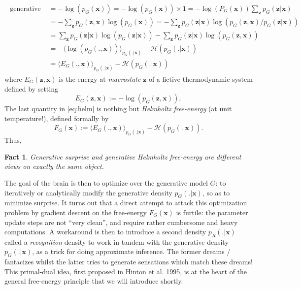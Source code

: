 \documentclass[10pt,letterpaper]{article}
\newtheorem{fact}[thm]{Fact}
\def\z{\mathbf{z}}
\def\x{\mathbf{x}}
\begin{document}
\begin{eqnarray}
  \begin{split}
    \text{generative surprise } &= -\log(p_G(\x)) = -\log(p_G(\x)) \times 1 = -\log(P_G(\x))\sum_{\z}p_G(\z |\x)\\
    &= -\sum_{\z}p_G(\z, \x)\log(p_G(\x))
    =-\sum_{\z}p_G(\z |\x)\log(p_G(\z, \x)/p_G(\z|\x))\\
    &= \sum_{\z}p_G(\z |\x)\log(p_G(\z|\x))-\sum_{\z}p_G(\z |\x)\log  (p_G(\z, \x))\\
    &= -\langle \log  (p_G(., \x)) \rangle_{p_G(. |\x)} - \mathcal H(p_G(. |\x))\\
    &= \langle E_G(., \x) \rangle_{p_G(. |\x)} - \mathcal H(p_G(. |\x))
  \end{split}
  \label{eq:helm}
\end{eqnarray}
where $E_G(\z, \x)$ is the energy at \textit{macrostate} $\z$ of a fictive thermodynamic system defined by setting
\begin{equation}
  E_G(\z, \x) := -\log(p_G(\z, \x)),
  \label{eq:gibbs}
\end{equation}
The last quantity in \eqref{eq:helm} is nothing but \textit{Helmholtz free-energy} (at unit temperature!), defined formally by
\begin{equation}
  F_G(\x) := \langle E_G(., \x) \rangle_{p_G(. |\x)} - \mathcal H(p_G(. |\x)).
\end{equation}
Thus,
\begin{fact}
  Generative surprise and generative Helmholtz free-energy are different views on exactly the same object.
\end{fact}

The goal of the brain is then to optimize over the generative model $G$: to iteratively or analytically modify the generative density $p_G(.|\x)$, so as to minimize surprise. It turns out that a direct attempt to attack this optimization problem by gradient descent on the free-energy $F_G(\x)$ is furtile: the parameter update steps are not ``very clean'', and require rather cumbersome and heavy computations. A workaround is then to introduce a second density $p_R(.|\x)$ called a \textit{recognition} density to work in tandem with the generative density $p_G(.|\x)$, as a trick for doing approximate inference. The former dreams / fantacizes whilst the latter tries to generate sensations which match these dreams! This primal-dual idea, first proposed in Hinton et al. 1995, is at the heart of the general free-energy principle that we will introduce shortly.
\end{document}
